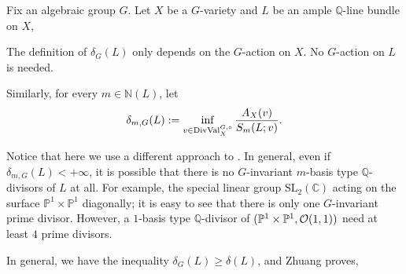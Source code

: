 \newcommand{\GL}{\mathrm{GL}}
\newcommand{\SL}{\mathrm{SL}}
\newcommand{\GDValo}{\DVal^{G, \circ}}

Fix an algebraic group $G$. Let $X$ be a $G$-variety and $L$ be an ample $\mathbb{Q}$-line bundle on $X$,
\begin{remark*}
	The definition of $\delta_G(L)$ only depends on the $G$-action on $X$. No $G$-action on $L$ is needed.
\end{remark*}

Similarly, for every $m \in \mathbb{N}(L)$, let
\begin{equation}
	\delta_{m, G}(L) := \inf_{v \in \GDValo_X} {A_X(v) \over S_m(L; v)} .
\end{equation}

\begin{remark}
	Notice that here we use a different approach to . In general, even if $\delta_{m, G}(L) < +\infty$, it is possible that there is no $G$-invariant $m$-basis type $\mathbb{Q}$-divisors of $L$ at all. For example, the special linear group $\SL_2(\mathbb{C})$ acting on the surface $\mathbb{P}^1 \times \mathbb{P}^1$ diagonally; it is easy to see that there is only one $G$-invariant prime divisor. However, a $1$-basis type $\mathbb{Q}$-divisor of $(\mathbb{P}^1 \times \mathbb{P}^1, \mathcal{O}(1, 1))$ need at least $4$ prime divisors.
\end{remark}

In general, we have the inequality $\delta_G(L) \geq \delta(L)$, and Zhuang proves,
